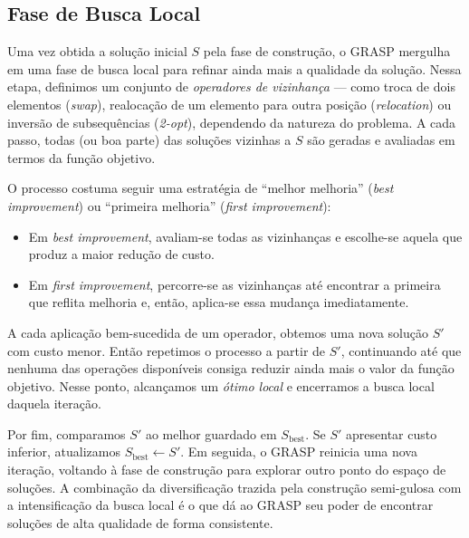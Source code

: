 \documentclass[a4paper, 12pt]{article}
\begin{document}
\subsection{Fase de Busca Local}

Uma vez obtida a solução inicial \(S\) pela fase de construção, o GRASP mergulha em uma fase de busca local para refinar ainda mais a qualidade da solução. Nessa etapa, definimos um conjunto de \emph{operadores de vizinhança} — como troca de dois elementos (\emph{swap}), realocação de um elemento para outra posição (\emph{relocation}) ou inversão de subsequências (\emph{2-opt}), dependendo da natureza do problema. A cada passo, todas (ou boa parte) das soluções vizinhas a \(S\) são geradas e avaliadas em termos da função objetivo.

O processo costuma seguir uma estratégia de “melhor melhoria” (\emph{best improvement}) ou “primeira melhoria” (\emph{first improvement}):
\begin{itemize}
  \item Em \emph{best improvement}, avaliam-se todas as vizinhanças e escolhe-se aquela que produz a maior redução de custo.
  \item Em \emph{first improvement}, percorre-se as vizinhanças até encontrar a primeira que reflita melhoria e, então, aplica-se essa mudança imediatamente.
\end{itemize}

A cada aplicação bem-sucedida de um operador, obtemos uma nova solução \(S'\) com custo menor. Então repetimos o processo a partir de \(S'\), continuando até que nenhuma das operações disponíveis consiga reduzir ainda mais o valor da função objetivo. Nesse ponto, alcançamos um \emph{ótimo local} e encerramos a busca local daquela iteração.

Por fim, comparamos \(S'\) ao melhor guardado em \(S_{\mathrm{best}}\). Se \(S'\) apresentar custo inferior, atualizamos \(S_{\mathrm{best}} \leftarrow S'\). Em seguida, o GRASP reinicia uma nova iteração, voltando à fase de construção para explorar outro ponto do espaço de soluções. A combinação da diversificação trazida pela construção semi-gulosa com a intensificação da busca local é o que dá ao GRASP seu poder de encontrar soluções de alta qualidade de forma consistente.
\end{document}
